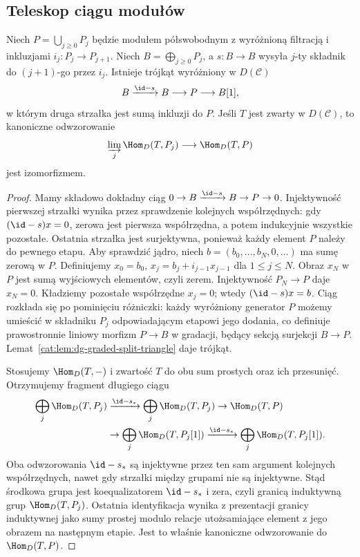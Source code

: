 \subsection{Teleskop ciągu modułów}

\begin{lemat}\label{cat:lem:dg-semifree-telescope}
Niech $P=\bigcup_{j\geq0}P_j$ będzie modułem półswobodnym z wyróżnioną filtracją i inkluzjami $i_j:P_j\to P_{j+1}$. Niech $B=\bigoplus_{j\geq0}P_j$, a $s:B\to B$ wysyła $j$-ty składnik do $(j+1)$-go przez $i_j$. Istnieje trójkąt wyróżniony w $D(\mathcal C)$
\[
 B\xrightarrow{\id-s}B\longrightarrow P\longrightarrow B[1],
\]
w którym druga strzałka jest sumą inkluzji do $P$. Jeśli $T$ jest zwarty w $D(\mathcal C)$, to kanoniczne odwzorowanie
\[
 \varinjlim_j\Hom_D(T,P_j)\longrightarrow\Hom_D(T,P)
\]
jest izomorfizmem.
\end{lemat}
\begin{proof}
Mamy składowo dokładny ciąg $0\to B\xrightarrow{\id-s}B\to P\to0$. Injektywność pierwszej strzałki wynika przez sprawdzenie kolejnych współrzędnych: gdy $(\id-s)x=0$, zerowa jest pierwsza współrzędna, a potem indukcyjnie wszystkie pozostałe. Ostatnia strzałka jest surjektywna, ponieważ każdy element $P$ należy do pewnego etapu. Aby sprawdzić jądro, niech $b=(b_0,\ldots,b_N,0,\ldots)$ ma sumę zerową w $P$. Definiujemy $x_0=b_0$, $x_j=b_j+i_{j-1}x_{j-1}$ dla $1\leq j\leq N$. Obraz $x_N$ w $P$ jest sumą wyjściowych elementów, czyli zerem. Injektywność $P_N\to P$ daje $x_N=0$. Kładziemy pozostałe współrzędne $x_j=0$; wtedy $(\id-s)x=b$. Ciąg rozkłada się po pominięciu różniczki: każdy wyróżniony generator $P$ możemy umieścić w składniku $P_j$ odpowiadającym etapowi jego dodania, co definiuje prawostronnie liniowy morfizm $P\to B$ w gradacji, będący sekcją surjekcji $B\to P$. Lemat~\ref{cat:lem:dg-graded-split-triangle} daje trójkąt.

Stosujemy $\Hom_D(T,-)$ i zwartość $T$ do obu sum prostych oraz ich przesunięć. Otrzymujemy fragment długiego ciągu
\[
\begin{aligned}
 \bigoplus_j\Hom_D(T,P_j)&\xrightarrow{\id-s_*}
 \bigoplus_j\Hom_D(T,P_j)\to\Hom_D(T,P)\\
 &\to\bigoplus_j\Hom_D(T,P_j[1])
 \xrightarrow{\id-s_*}\bigoplus_j\Hom_D(T,P_j[1]).
\end{aligned}
\]
Oba odwzorowania $\id-s_*$ są injektywne przez ten sam argument kolejnych współrzędnych, nawet gdy strzałki między grupami nie są injektywne. Stąd środkowa grupa jest koequalizatorem $\id-s_*$ i zera, czyli granicą induktywną grup $\Hom_D(T,P_j)$. Ostatnia identyfikacja wynika z prezentacji granicy induktywnej jako sumy prostej modulo relacje utożsamiające element z jego obrazem na następnym etapie. Jest to właśnie kanoniczne odwzorowanie do $\Hom_D(T,P)$.
\end{proof}

